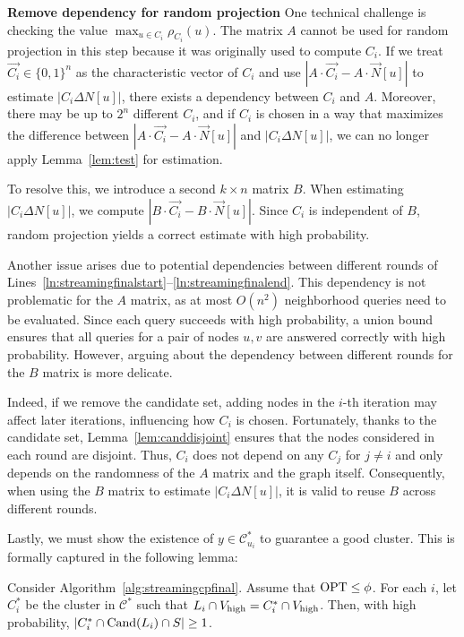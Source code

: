 \textbf{Remove dependency for random projection} One technical challenge is checking the value $\max_{u \in C_i} \rho_{C_i}(u)$. The matrix $A$ cannot be used for random projection in this step because it was originally used to compute $C_i$. If we treat $\vec{C_i} \in \{0,1\}^n$ as the characteristic vector of $C_i$ and use $|A \cdot \vec{C_i} - A \cdot \vec{N}[u]|$ to estimate $|C_i \Delta N[u]|$, there exists a dependency between $C_i$ and $A$. Moreover, there may be up to $2^n$ different $C_i$, and if $C_i$ is chosen in a way that maximizes the difference between $|A \cdot \vec{C_i} - A \cdot \vec{N}[u]|$ and $|C_i \Delta N[u]|$, we can no longer apply Lemma~\ref{lem:test} for estimation.

To resolve this, we introduce a second $k \times n$ matrix $B$. When estimating $|C_i \Delta N[u]|$, we compute $|B\cdot \vec{C_i} - B\cdot \vec{N}[u]|$. Since $C_i$ is independent of $B$, random projection yields a correct estimate with high probability.

Another issue arises due to potential dependencies between different rounds of Lines~\ref{ln:streamingfinalstart}--\ref{ln:streamingfinalend}. This dependency is not problematic for the $A$ matrix, as at most $O(n^2)$ neighborhood queries need to be evaluated. Since each query succeeds with high probability, a union bound ensures that all queries for a pair of nodes $u, v$ are answered correctly with high probability. However, arguing about the dependency between different rounds for the $B$ matrix is more delicate. 

Indeed, if we remove the candidate set, adding nodes in the $i$-th iteration may affect later iterations, influencing how $C_i$ is chosen. Fortunately, thanks to the candidate set, Lemma~\ref{lem:canddisjoint} ensures that the nodes considered in each round are disjoint. Thus, $C_i$ does not depend on any $C_j$ for $j \neq i$ and only depends on the randomness of the $A$ matrix and the graph itself. Consequently, when using the $B$ matrix to estimate $|C_i \Delta N[u]|$, it is valid to reuse $B$ across different rounds.

 


Lastly, we must show the existence of $y \in \mathcal{C}^*_{u_i}$ to guarantee a good cluster. This is formally captured in the following lemma:

\begin{lemma}
Consider Algorithm~\ref{alg:streamingcpfinal}. Assume that $\mathrm{OPT} \leq \phi$. For each $i$, let $C^*_i$ be the cluster in $\mathcal{C}^*$ such that $L_i \cap V_{\operatorname{high}} = C^*_i \cap V_{\operatorname{high}}$. Then, with high probability, $|C^*_i \cap \mathrm{Cand}(L_i) \cap S | \geq 1$.
\end{lemma}

